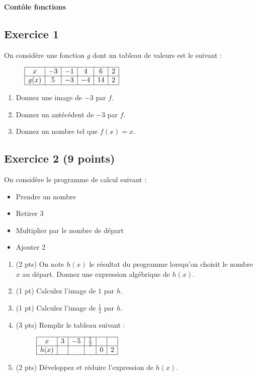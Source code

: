 \documentclass[14 pt, fleqn, pstricks]{extarticle}
\theoremstyle{plain}
\begin{document}
	 \begin{center} {\Large \textbf{Contôle fonctions}}
	 


\subsection*{Exercice 1}	 
	 
On considère une fonction $g$ dont un tableau de valeurs est le suivant : \begin{figure}[H]
\center
$\begin{array}{|c|c|c|c|c|c|}
\hline
 x &  -3 & -1 & 4 & 6  &  2 \\
\hline
g(x)&  5 & -3  & -4 & 14 &   2  \\
\hline
\end{array}$
\end{figure}	 

\begin{enumerate}
\item Donnez une image de $-3$ par $f$. 
\item Donnez un antécédent de $-3$ par $f$. 
\item Donnez un nombre tel que $f(x)= x$.
\end{enumerate}

\subsection*{Exercice 2 (9 points) }	 
	 
On considère le programme de calcul suivant : 
\begin{itemize}
\item Prendre un nombre
\item Retirer 3
\item Multiplier par le nombre de départ 
\item Ajouter 2
\end{itemize}
\begin{enumerate}
\item (2 pts) On note $h(x)$ le résultat du programme lorsqu'on choisit le nombre $x$ au départ. Donnez une expression algébrique de $h(x)$.
\item (1 pt) Calculez l'image de $1$ par $h$. 
\item (1 pt) Calculez l'image de $\frac12$ par $h$.
\item (3 pts) Remplir le tableau suivant : 
	 
\begin{figure}[H]
\center
$\begin{array}{|c|c|c|c|c|c|}
\hline
 x &  3 & -5 & \frac12 &    &   \\
\hline
h(x)&   & & & 0 &  2   \\
\hline
\end{array}$
\end{figure}
\item (2 pts) Développez et réduire l'expression de $h(x)$. 
\end{enumerate} 
\newpage


\end{center}
\end{document}
